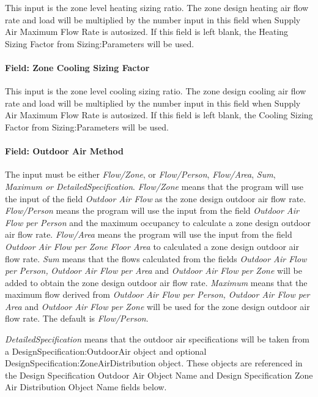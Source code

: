 This input is the zone level heating sizing ratio. The zone design heating air flow rate and load will be multiplied by the number input in this field when Supply Air Maximum Flow Rate is autosized. If this field is left blank, the Heating Sizing Factor from Sizing:Parameters will be used.

\paragraph{Field: Zone Cooling Sizing Factor}\label{field-zone-cooling-sizing-factor-5}

This input is the zone level cooling sizing ratio. The zone design cooling air flow rate and load will be multiplied by the number input in this field when Supply Air Maximum Flow Rate is autosized. If this field is left blank, the Cooling Sizing Factor from Sizing:Parameters will be used.

\paragraph{Field: Outdoor Air Method}\label{field-outdoor-air-method-7}

The input must be either \emph{Flow/Zone}, or \emph{Flow/Person}, \emph{Flow/Area}, \emph{Sum}, \emph{Maximum or DetailedSpecification}. \emph{Flow/Zone} means that the program will use the input of the field \emph{Outdoor Air Flow} as the zone design outdoor air flow rate. \emph{Flow/Person} means the program will use the input from the field \emph{Outdoor Air Flow per Person} and the maximum occupancy to calculate a zone design outdoor air flow rate. \emph{Flow/Area} means the program will use the input from the field \emph{Outdoor Air Flow per Zone Floor Area} to calculated a zone design outdoor air flow rate. \emph{Sum} means that the flows calculated from the fields \emph{Outdoor Air Flow per Person,} \emph{Outdoor Air Flow per Area} and \emph{Outdoor Air Flow per Zone} will be added to obtain the zone design outdoor air flow rate. \emph{Maximum} means that the maximum flow derived from \emph{Outdoor Air Flow per Person,} \emph{Outdoor Air Flow per Area} and \emph{Outdoor Air Flow per Zone} will be used for the zone design outdoor air flow rate. The default is \emph{Flow/Person}.

\emph{DetailedSpecification} means that the outdoor air specifications will be taken from a DesignSpecification:OutdoorAir object and optional DesignSpecification:ZoneAirDistribution object. These objects are referenced in the Design Specification Outdoor Air Object Name and Design Specification Zone Air Distribution Object Name fields below.

